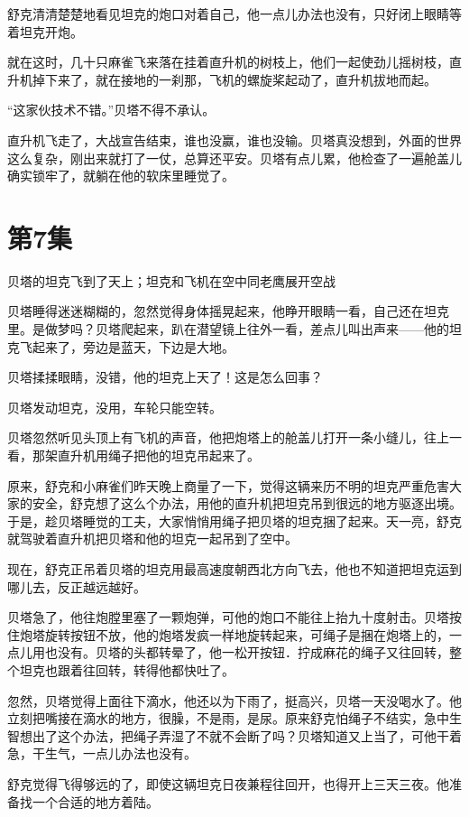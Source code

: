 \documentclass[a4paper,12pt,UTF8,twoside]{ctexbook}
\begin{document}
舒克清清楚楚地看见坦克的炮口对着自己，他一点儿办法也没有，只好闭上眼睛等着坦克开炮。

就在这时，几十只麻雀飞来落在挂着直升机的树枝上，他们一起使劲儿摇树枝，直升机掉下来了，就在接地的一刹那，飞机的螺旋桨起动了，直升机拔地而起。

“这家伙技术不错。”贝塔不得不承认。

直升机飞走了，大战宣告结束，谁也没赢，谁也没输。贝塔真没想到，外面的世界这么复杂，刚出来就打了一仗，总算还平安。贝塔有点儿累，他检查了一遍舱盖儿确实锁牢了，就躺在他的软床里睡觉了。

\chapter{第7集}

贝塔的坦克飞到了天上；坦克和飞机在空中同老鹰展开空战

贝塔睡得迷迷糊糊的，忽然觉得身体摇晃起来，他睁开眼睛一看，自己还在坦克里。是做梦吗？贝塔爬起来，趴在潜望镜上往外一看，差点儿叫出声来——他的坦克飞起来了，旁边是蓝天，下边是大地。

贝塔揉揉眼睛，没错，他的坦克上天了！这是怎么回事？

贝塔发动坦克，没用，车轮只能空转。

贝塔忽然听见头顶上有飞机的声音，他把炮塔上的舱盖儿打开一条小缝儿，往上一看，那架直升机用绳子把他的坦克吊起来了。

原来，舒克和小麻雀们昨天晚上商量了一下，觉得这辆来历不明的坦克严重危害大家的安全，舒克想了这么个办法，用他的直升机把坦克吊到很远的地方驱逐出境。于是，趁贝塔睡觉的工夫，大家悄悄用绳子把贝塔的坦克捆了起来。天一亮，舒克就驾驶着直升机把贝塔和他的坦克一起吊到了空中。

现在，舒克正吊着贝塔的坦克用最高速度朝西北方向飞去，他也不知道把坦克运到哪儿去，反正越远越好。

贝塔急了，他往炮膛里塞了一颗炮弹，可他的炮口不能往上抬九十度射击。贝塔按住炮塔旋转按钮不放，他的炮塔发疯一样地旋转起来，可绳子是捆在炮塔上的，一点儿用也没有。贝塔的头都转晕了，他一松开按钮．拧成麻花的绳子又往回转，整个坦克也跟着往回转，转得他都快吐了。

忽然，贝塔觉得上面往下滴水，他还以为下雨了，挺高兴，贝塔一天没喝水了。他立刻把嘴接在滴水的地方，很臊，不是雨，是尿。原来舒克怕绳子不结实，急中生智想出了这个办法，把绳子弄湿了不就不会断了吗？贝塔知道又上当了，可他干着急，干生气，一点儿办法也没有。

舒克觉得飞得够远的了，即使这辆坦克日夜兼程往回开，也得开上三天三夜。他准备找一个合适的地方着陆。
\end{document}
